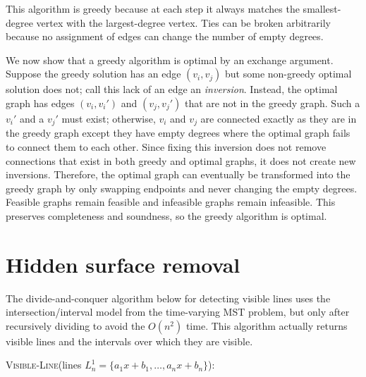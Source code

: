 \documentclass[12pt]{article}
\begin{document}
This algorithm is greedy because at each step it always matches the
smallest-degree vertex with the largest-degree vertex. Ties can be broken
arbitrarily because no assignment of edges can change the number of
empty degrees.

We now show that a greedy algorithm is optimal
by an exchange argument. Suppose the greedy solution has an edge
$(v_i,v_j)$ but some non-greedy optimal solution does not; call this
lack of an edge an \textit{inversion}.
Instead, the optimal graph has edges $(v_i,v_i')$ and
$(v_j,v_j')$ that are not in the greedy graph. Such a $v_i'$ and a $v_j'$ must
exist; otherwise, $v_i$ and $v_j$ are connected exactly as they are in the
greedy graph except they have empty degrees where the optimal graph fails
to connect them to each other. Since fixing this inversion does not
remove connections that exist in both greedy and optimal graphs, it does
not create new inversions. Therefore, the optimal graph can eventually
be transformed into the greedy graph by only swapping endpoints and
never changing the empty degrees. Feasible graphs remain feasible and
infeasible graphs remain infeasible.
This preserves completeness and soundness, so the greedy algorithm is
optimal.

\section{Hidden surface removal}

The divide-and-conquer algorithm below for detecting visible lines uses
the intersection/interval model from the time-varying MST problem, but only
after recursively dividing to avoid the $O(n^2)$ time. This algorithm
actually returns visible lines and the intervals over which they are
visible.

\vspace{\baselineskip}
\textsc{Visible-Line}(lines $L^1_n = \{a_1x + b_1,\ldots ,a_nx + b_n\}$):
\end{document}
